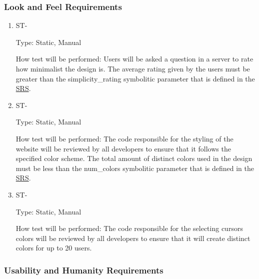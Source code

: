 \documentclass[12pt, titlepage]{article}
\newcounter{TESTID}
\newcommand\TESTNUM{\stepcounter{TESTID}\theTESTID}
\begin{document}
	
	
	\subsubsection{Look and Feel Requirements}
	
	\begin{enumerate}
		
		\item{ST-\TESTNUM\\}
		
		Type: Static, Manual
		
		How test will be performed: Users will be asked a question in a server to rate how minimalist the design is. The average rating given by the users must be greater than the simplicity\_rating symbolitic parameter that is defined in the \href{https://github.com/RutheniumVI/UnderTree/blob/main/docs/SRS/SRS.pdf}{SRS}.
		
		\item{ST-\TESTNUM\\}
		
		Type: Static, Manual
		
		How test will be performed: The code responsible for the styling of the website will be reviewed by all developers to ensure that it follows the specified color scheme. The total amount of distinct colors used in the design must be less than the num\_colors symbolitic parameter that is defined in the \href{https://github.com/RutheniumVI/UnderTree/blob/main/docs/SRS/SRS.pdf}{SRS}.
		
		\item{ST-\TESTNUM\\}
		
		Type: Static, Manual
		
		How test will be performed: The code responsible for the selecting cursors colors will be reviewed by all developers to ensure that it will create distinct colors for up to 20 users.
		
		
	\end{enumerate}
	
	\subsubsection{Usability and Humanity Requirements}
	
\end{document}
